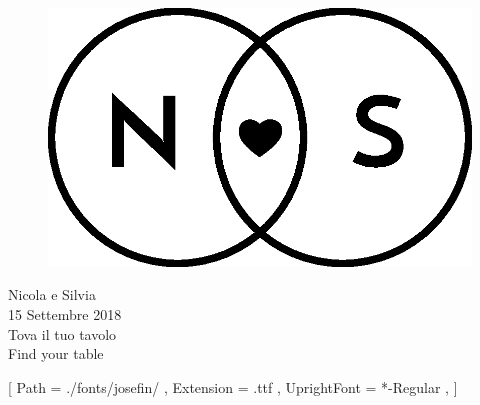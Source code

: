 \documentclass[20pt]{extarticle}
\begin{document}
\begin{figure}
\centering
\includegraphics[scale=1.3]{img/Logo_piccolo.eps}
\end{figure}
\begin{center}
\Huge Nicola e Silvia\\
\Large 15 Settembre 2018\\

\vspace{30mm}
{\fontsize{100}{120}\selectfont Tova il tuo tavolo\\}
\vspace{5mm}
{\fontsize{100}{120}\selectfont Find your table}
\vspace{30mm}
\end{center}
\setmainfont{JosefinSans}[
Path = ./fonts/josefin/ ,
Extension = .ttf ,
UprightFont = *-Regular ,
]
\begin{figure}[h!]
\centering
\large{}
\end{figure}
\end{document}
